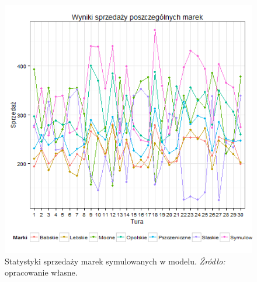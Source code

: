 \documentclass[polish, twoside, 12pt, a4paper]{article}
\theoremstyle{definition}
\theoremstyle{plain}
\theoremstyle{remark}
\begin{document}
\begin{figure}[hbt]
  \centering
    \includegraphics[width=\textwidth]{pictures/sprzedaz_marek.png}
  \captionsetup{margin=10pt,font=small,labelfont=bf,width=.8\textwidth}
  \caption[Statystyki sprzedaży marek symulowanych w modelu]{Statystyki sprzedaży marek symulowanych w modelu. \textit{Źródło:} opracowanie własne.}\label{fig:sprzedaz_marek}
\end{figure}
\end{document}
